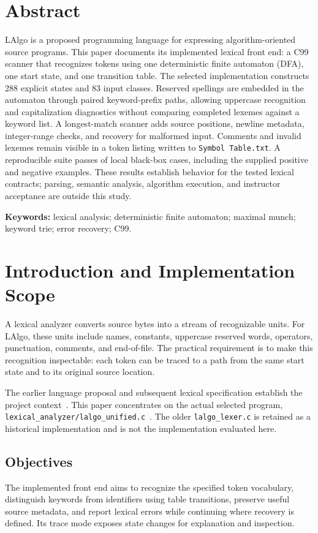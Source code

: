 \documentclass[11pt,a4paper]{article}
\newcommand{\code}[1]{\texttt{#1}}
\begin{document}
\section*{Abstract}
LAlgo is a proposed programming language for expressing algorithm-oriented source
programs. This paper documents its implemented lexical front end: a C99 scanner
that recognizes tokens using one deterministic finite automaton (DFA), one start
state, and one transition table. The selected implementation constructs 288
explicit states and 83 input classes. Reserved spellings are embedded in the
automaton through paired keyword-prefix paths, allowing uppercase recognition
and capitalization diagnostics without comparing completed lexemes against a
keyword list. A longest-match scanner adds source positions, newline metadata,
integer-range checks, and recovery for malformed input. Comments and invalid
lexemes remain visible in a token listing written to \code{Symbol Table.txt}.
A reproducible suite passes \ValidationPassed{} of \ValidationCases{} local
black-box cases, including the supplied positive and negative examples. These
results establish behavior for the tested lexical contracts; parsing, semantic
analysis, algorithm execution, and instructor acceptance are outside this study.

{\small\textbf{Keywords:} lexical analysis; deterministic finite automaton;
maximal munch; keyword trie; error recovery; C99.}

\section{Introduction and Implementation Scope}
A lexical analyzer converts source bytes into a stream of recognizable units.
For LAlgo, these units include names, constants, uppercase reserved words,
operators, punctuation, comments, and end-of-file. The practical requirement is
to make this recognition inspectable: each token can be traced to a path from
the same start state and to its original source location.

The earlier language proposal and subsequent lexical specification establish
the project context~\cite{spec,proposal}. This paper concentrates on the actual
selected program, \code{lexical\_analyzer/}\allowbreak\code{lalgo\_unified.c}~\cite{impl}.
The older \code{lalgo\_lexer.c} is retained as a historical implementation and
is not the implementation evaluated here.

\subsection{Objectives}
The implemented front end aims to recognize the specified token vocabulary,
distinguish keywords from identifiers using table transitions, preserve useful
source metadata, and report lexical errors while continuing where recovery is
defined. Its trace mode exposes state changes for explanation and inspection.
\end{document}
